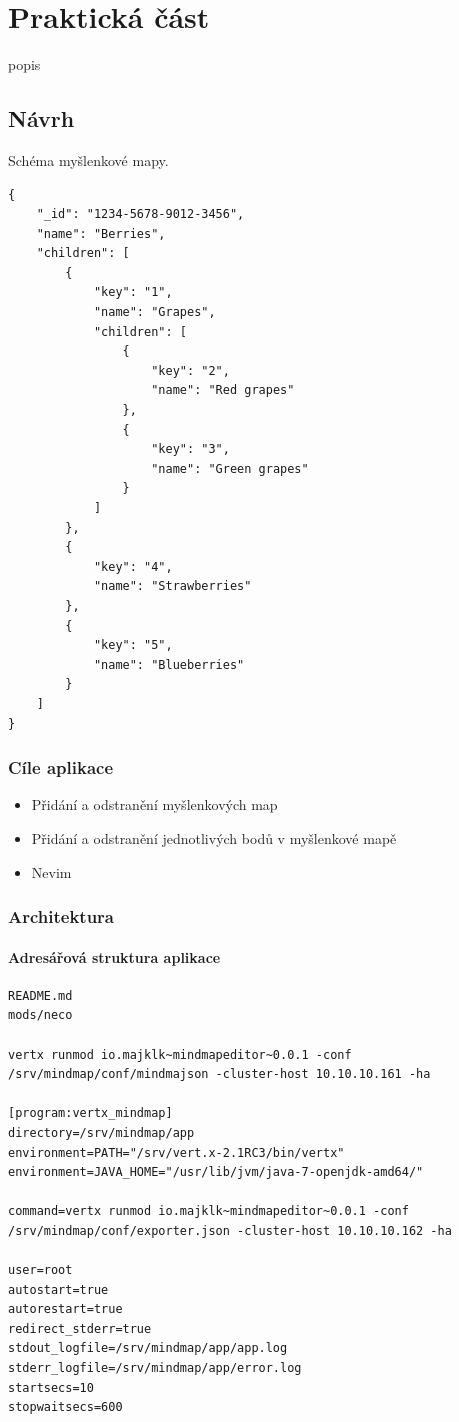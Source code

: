 
\chapter{Praktická část}

popis

\section{Návrh}

Schéma myšlenkové mapy.

\begin{lstlisting}
{
	"_id": "1234-5678-9012-3456",
	"name": "Berries",
	"children": [
		{
			"key": "1",
			"name": "Grapes",
			"children": [
				{
					"key": "2",
					"name": "Red grapes"
				},
				{
					"key": "3",
					"name": "Green grapes"
				}
			]
		},
		{
			"key": "4",
			"name": "Strawberries"
		},
		{
			"key": "5",
			"name": "Blueberries"
		}
	]
}

\end{lstlisting}

\subsection{Cíle aplikace}

\begin{itemize}
\item Přidání a odstranění myšlenkových map
\item Přidání a odstranění jednotlivých bodů v myšlenkové mapě
\item Nevim
\end{itemize}

\subsection{Architektura}

\subsubsection{Adresářová struktura aplikace}

\begin{lstlisting}
README.md
mods/neco

vertx runmod io.majklk~mindmapeditor~0.0.1 -conf /srv/mindmap/conf/mindmajson -cluster-host 10.10.10.161 -ha

[program:vertx_mindmap]
directory=/srv/mindmap/app
environment=PATH="/srv/vert.x-2.1RC3/bin/vertx"
environment=JAVA_HOME="/usr/lib/jvm/java-7-openjdk-amd64/"

command=vertx runmod io.majklk~mindmapeditor~0.0.1 -conf /srv/mindmap/conf/exporter.json -cluster-host 10.10.10.162 -ha

user=root
autostart=true
autorestart=true
redirect_stderr=true
stdout_logfile=/srv/mindmap/app/app.log
stderr_logfile=/srv/mindmap/app/error.log
startsecs=10
stopwaitsecs=600

\end{lstlisting}

